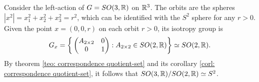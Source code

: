 \begin{ex}
    Consider the left-action of $G = SO(3,\mathbb{R})$ on $\mathbb{R}^3$. The orbits are the spheres $|x^2| = x_1^2 + x_2^2 + x_3^2 = r^2$, which can be identified with the $S^2$ sphere for any $r > 0$. Given the point $x = (0,0,r)$ on each orbit $r > 0$, its isotropy group is
    \begin{equation}
        G_x = \bigg\{
        \begin{pmatrix}
            A_{2 \times 2} & 0 \\
            0 & 1 
        \end{pmatrix} : A_{2 \times 2} \in SO(2,\mathbb{R})
        \bigg\} \simeq SO(2,\mathbb{R}).
    \end{equation}
    By theorem \ref{teo: correspondence quotient-set} and its corollary \ref{corl: correspondence quotient-set}, it follows that $SO(3,\mathbb{R})/SO(2,\mathbb{R}) \simeq S^2$.
\end{ex}

